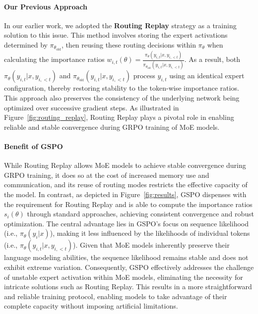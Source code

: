 \paragraph{Our Previous Approach} In our earlier work, we adopted the \textbf{Routing Replay} strategy as a training solution to this issue. This method involves storing the expert activations determined by $\pi_{\theta_\text{old}}$, then reusing these routing decisions within $\pi_{\theta}$ when calculating the importance ratios $w_{i,t}(\theta) = \frac{ \pi_{\theta} (y_{i,t} | x, y_{i,<t}) }{ \pi_{\theta_\text{old}} (y_{i,t} | x,y_{i,<t})}$. As a result, both $\pi_{\theta} (y_{i,t} | x, y_{i,<t})$ and $\pi_{\theta_\text{old}} (y_{i,t} | x,y_{i,<t})$ process $y_{i,t}$ using an identical expert configuration, thereby restoring stability to the token-wise importance ratios. This approach also preserves the consistency of the underlying network being optimized over successive gradient steps. As illustrated in Figure~\ref{fig:routing_replay}, Routing Replay plays a pivotal role in enabling reliable and stable convergence during GRPO training of MoE models.

\paragraph{Benefit of GSPO} While Routing Replay allows MoE models to achieve stable convergence during GRPO training, it does so at the cost of increased memory use and communication, and its reuse of routing modes restricts the effective capacity of the model. In contrast, as depicted in Figure~\ref{fig:results}, GSPO dispenses with the requirement for Routing Replay and is able to compute the importance ratios $s_i(\theta)$ through standard approaches, achieving consistent convergence and robust optimization. The central advantage lies in GSPO's focus on sequence likelihood (i.e., $\pi_{\theta} (y_i | x)$), making it less influenced by the likelihoods of individual tokens (i.e., $\pi_{\theta} (y_{i,t} | x, y_{i,<t})$). Given that MoE models inherently preserve their language modeling abilities, the sequence likelihood remains stable and does not exhibit extreme variation. Consequently, GSPO effectively addresses the challenge of unstable expert activation within MoE models, eliminating the necessity for intricate solutions such as Routing Replay. This results in a more straightforward and reliable training protocol, enabling models to take advantage of their complete capacity without imposing artificial limitations.

